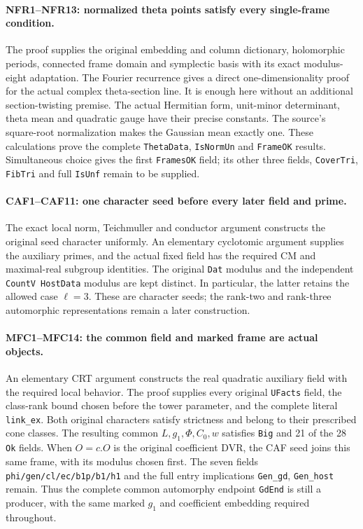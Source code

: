 \paragraph{NFR1--NFR13: normalized theta points satisfy every single-frame condition.}
The proof supplies the original embedding and column dictionary,
holomorphic periods, connected frame domain and symplectic basis with
its exact modulus-eight adaptation. The Fourier recurrence gives a
direct one-dimensionality proof for the actual complex theta-section
line. It is enough here without an additional section-twisting premise.
The actual Hermitian form, unit-minor determinant, theta mean and
quadratic gauge have their precise constants. The source's square-root
normalization makes the Gaussian mean exactly one. These calculations
prove the complete \texttt{Theta\allowbreak Data}, \texttt{Is\allowbreak Norm\allowbreak Un} and
\texttt{Frame\allowbreak OK} results. Simultaneous choice gives the first
\texttt{Frames\allowbreak OK} field; its other three fields, \texttt{Cover\allowbreak Tri},
\texttt{Fib\allowbreak Tri} and full \texttt{Is\allowbreak Unf} remain to be supplied.

\paragraph{CAF1--CAF11: one character seed before every later field and prime.}
The exact local norm, Teichmuller and conductor argument constructs the
original seed character uniformly. An elementary cyclotomic argument
supplies the auxiliary primes, and the actual fixed field has the
required CM and maximal-real subgroup identities. The original
\texttt{Dat} modulus and the independent \texttt{Count\allowbreak V Host\allowbreak Data}
modulus are kept distinct. In particular, the latter retains the
allowed case $\ell=3$. These are character seeds; the rank-two and
rank-three automorphic representations remain a later construction.

\paragraph{MFC1--MFC14: the common field and marked frame are actual objects.}
An elementary CRT argument constructs the real quadratic auxiliary field
with the required local behavior. The proof supplies every original
\texttt{UFacts} field, the class-rank bound chosen before the tower
parameter, and the complete literal \texttt{link\_\allowbreak ex}. Both original
characters satisfy strictness and belong to their prescribed cone
classes. The resulting common $L,g_1,\Phi,C_0,w$ satisfies
\texttt{Big} and 21 of the 28 \texttt{Ok} fields. When $O=c.O$ is
the original coefficient DVR, the CAF seed joins this same frame,
with its modulus chosen first.
The seven fields \texttt{phi/\allowbreak gen/\allowbreak cl/\allowbreak ec/\allowbreak b1p/\allowbreak b1/\allowbreak h1} and the full entry
implications \texttt{Gen\_\allowbreak gd}, \texttt{Gen\_\allowbreak host} remain. Thus
the complete common automorphy endpoint \texttt{Gd\allowbreak End} is still a
producer, with the same marked $g_1$ and coefficient embedding required
throughout.

